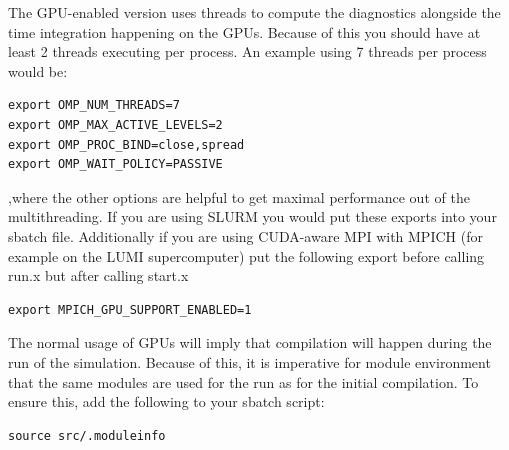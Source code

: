 \documentclass[\mydriver,12pt,twoside,notitlepage,a4paper]{article}
\begin{document}
The GPU-enabled version uses threads to compute the diagnostics alongside the time integration happening on the GPUs.
Because of this you should have at least 2 threads executing per process.
An example using 7 threads per process would be:
\begin{verbatim}
export OMP_NUM_THREADS=7
export OMP_MAX_ACTIVE_LEVELS=2
export OMP_PROC_BIND=close,spread
export OMP_WAIT_POLICY=PASSIVE
\end{verbatim}
,where the other options are helpful to get maximal performance out of the multithreading.
If you are using SLURM you would put these exports into your sbatch file. 
Additionally if you are using CUDA-aware MPI with MPICH (for example on the LUMI supercomputer) put the following export before calling run.x but after calling start.x
\begin{verbatim}
export MPICH_GPU_SUPPORT_ENABLED=1
\end{verbatim}

The normal usage of GPUs will imply that compilation will happen during the run of the simulation.
Because of this, it is imperative for module environment that the same modules are used for the run as for the initial compilation.
To ensure this, add the following to your sbatch script:
\begin{verbatim}
source src/.moduleinfo
\end{verbatim}
\end{document}
